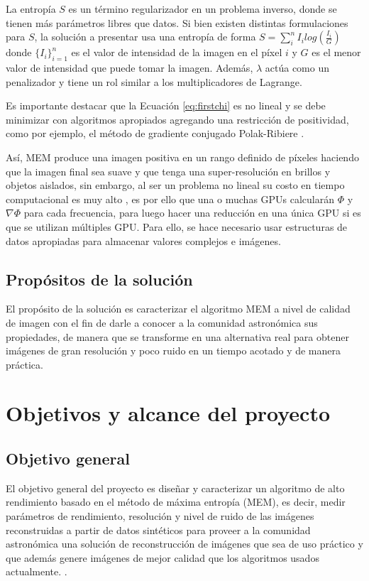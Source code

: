 La entropía $S$ es un término regularizador en un problema inverso, donde se tienen más parámetros libres que datos. Si bien existen distintas formulaciones para $S$, la solución a presentar usa una entropía de forma $S = \sum_{i}^{n} I_{i}log(\frac{I_{i}}{G})$ donde $\{I_{i}\}_{i=1}^{n}$ es el valor de intensidad de la imagen en el píxel $i$ y $G$ es el menor valor de intensidad que puede tomar la imagen. Además, $\lambda$ actúa como un penalizador y tiene un rol similar a los multiplicadores de Lagrange.


Es importante destacar que la Ecuación \ref{eq:firstchi} es no lineal y se debe minimizar con algoritmos apropiados agregando una restricción de positividad, como por ejemplo, el método de gradiente conjugado Polak-Ribiere \citep{polak}.

Así, MEM produce una imagen positiva en un rango definido de píxeles haciendo que la imagen final sea suave y que tenga una super-resolución en brillos y objetos aislados, sin embargo, al ser un problema no lineal su costo en tiempo computacional es muy alto \citep{libroAstro2}, es por ello que una o muchas GPUs calcularán $\Phi$ y $\nabla\Phi$ para cada frecuencia, para luego hacer una reducción en una única GPU si es que se utilizan múltiples GPU. Para ello, se hace necesario usar estructuras de datos apropiadas para almacenar valores complejos e imágenes.

\subsection{Propósitos de la solución}
El propósito de la solución es caracterizar el algoritmo MEM a nivel de calidad de imagen con el fin de darle a conocer a la comunidad astronómica sus propiedades, de manera que se transforme en una alternativa real para obtener imágenes de gran resolución y poco ruido en un tiempo acotado y de manera práctica.


\section{Objetivos y alcance del proyecto}
\label{intro:objetivos}

\subsection{Objetivo general}
El objetivo general del proyecto es diseñar y caracterizar un algoritmo de alto rendimiento basado en el método de máxima entropía (MEM), es decir, medir parámetros de rendimiento, resolución y nivel de ruido de las imágenes reconstruidas a partir de datos sintéticos para proveer a la comunidad astronómica una solución de reconstrucción de imágenes que sea de uso práctico y que además genere imágenes de mejor calidad que los algoritmos usados actualmente.
.

